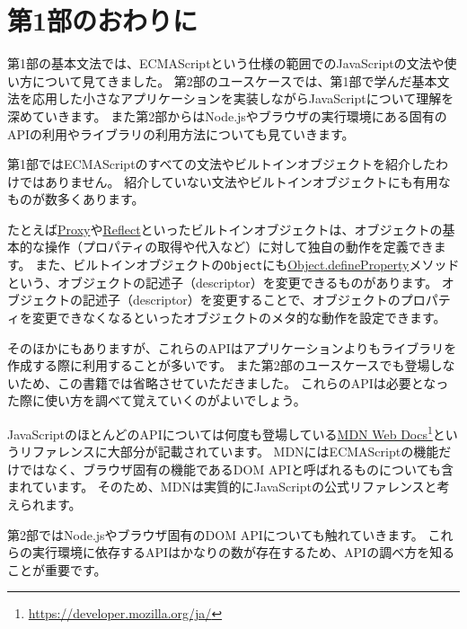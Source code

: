 \hypertarget{end-of-basic-grammar}{%
\chapter*{第1部のおわりに}\label{end-of-basic-grammar}}
\thispagestyle{frontheadings}

第1部の基本文法では、ECMAScriptという仕様の範囲でのJavaScriptの文法や使い方について見てきました。
第2部のユースケースでは、第1部で学んだ基本文法を応用した小さなアプリケーションを実装しながらJavaScriptについて理解を深めていきます。
また第2部からはNode.jsやブラウザの実行環境にある固有のAPIの利用やライブラリの利用方法についても見ていきます。

第1部ではECMAScriptのすべての文法やビルトインオブジェクトを紹介したわけではありません。
紹介していない文法やビルトインオブジェクトにも有用なものが数多くあります。

たとえば\href{https://developer.mozilla.org/ja/docs/Web/JavaScript/Reference/Global_Objects/Proxy}{Proxy}や\href{https://developer.mozilla.org/ja/docs/Web/JavaScript/Reference/Global_Objects/Reflect}{Reflect}といったビルトインオブジェクトは、オブジェクトの基本的な操作（プロパティの取得や代入など）に対して独自の動作を定義できます。
また、ビルトインオブジェクトの\texttt{Object}にも\href{https://developer.mozilla.org/ja/docs/Web/JavaScript/Reference/Global_Objects/Object/defineProperty}{Object.defineProperty}メソッドという、オブジェクトの記述子（descriptor）を変更できるものがあります。
オブジェクトの記述子（descriptor）を変更することで、オブジェクトのプロパティを変更できなくなるといったオブジェクトのメタ的な動作を設定できます。

そのほかにもありますが、これらのAPIはアプリケーションよりもライブラリを作成する際に利用することが多いです。
また第2部のユースケースでも登場しないため、この書籍では省略させていただきました。
これらのAPIは必要となった際に使い方を調べて覚えていくのがよいでしょう。

JavaScriptのほとんどのAPIについては何度も登場している\href{https://developer.mozilla.org/ja/}{MDN
Web Docs}\footnote{\url{https://developer.mozilla.org/ja/}}というリファレンスに大部分が記載されています。
MDNにはECMAScriptの機能だけではなく、ブラウザ固有の機能であるDOM
APIと呼ばれるものについても含まれています。
そのため、MDNは実質的にJavaScriptの公式リファレンスと考えられます。

第2部ではNode.jsやブラウザ固有のDOM APIについても触れていきます。
これらの実行環境に依存するAPIはかなりの数が存在するため、APIの調べ方を知ることが重要です。

